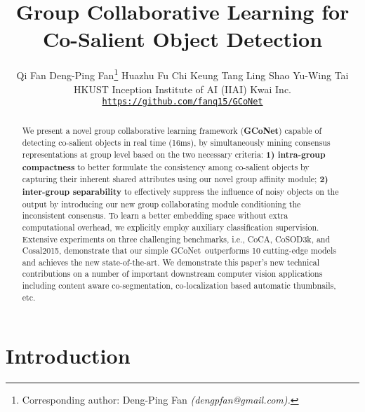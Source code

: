 \documentclass[final]{cvpr}
\def\ourmodel{GCoNet}
\begin{document}



\title{Group Collaborative Learning for Co-Salient Object Detection}


\author{
Qi Fan\quad
Deng-Ping Fan\thanks{Corresponding author: Deng-Ping Fan \emph{(dengpfan@gmail.com). }}\quad
Huazhu Fu\quad
Chi Keung Tang\quad
Ling Shao\quad
Yu-Wing Tai\\
 HKUST \quad
 Inception Institute of AI (IIAI) \quad
 Kwai Inc.\\
{\tt \small \url{https://github.com/fanq15/GCoNet}}
}

\maketitle


\begin{abstract}




\vspace{-10pt}
We present a novel group collaborative learning framework (\textbf{\ourmodel}) capable of detecting co-salient objects in real time (16ms), by simultaneously mining consensus representations at  group level based on the two necessary criteria:
\textbf{1) intra-group compactness} to better formulate the consistency among co-salient objects by capturing their inherent shared attributes using our novel group affinity module; 
\textbf{2) inter-group separability} to effectively suppress the influence of noisy objects on the output by introducing our new group collaborating module conditioning the inconsistent consensus. 
To learn a better embedding space without extra computational overhead, we explicitly employ auxiliary classification supervision.
Extensive experiments on three challenging benchmarks, i.e., CoCA, CoSOD3k, and Cosal2015,  demonstrate that our simple \ourmodel~outperforms 10 cutting-edge models and achieves the new state-of-the-art. We demonstrate this paper's new technical contributions on
a number of important downstream computer vision applications including content aware co-segmentation, co-localization based automatic thumbnails, etc. 




\end{abstract}

\section{Introduction}
\end{document}
